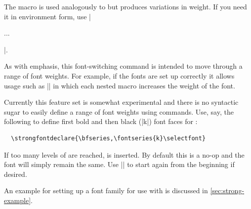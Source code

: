 \documentclass[a4paper]{l3doc}
\begin{document}
\DescribeMacro{\strong}
\DescribeMacro{\strongenv}
The  macro is used analogously to  but produces variations in weight.
If you need it in environment form, use |\begin{strongenv}...\end{strongenv}|.

As with emphasis, this font-switching command is intended to move through a range
of font weights. For example, if the fonts are set up correctly it allows usage such as
|| in which each nested  macro increases the
weight of the font.

\DescribeMacro{\strongfontdeclare}
Currently this feature set is somewhat experimental and there is no syntactic sugar
to easily define a range of font weights using  commands.
Use, say, the following to define first bold and then black (|k|) font faces for :
\begin{Verbatim}
  \strongfontdeclare{\bfseries,\fontseries{k}\selectfont}
\end{Verbatim}

\DescribeMacro{\strongreset}
If too many levels of  are reached,  is inserted.
By default this is a no-op and the font will simply remain the same.
Use |{\mdseries}| to start again from the beginning if desired.

An example for setting up a font family for use with  is discussed in \vref{sec:strong-example}.
\end{document}
